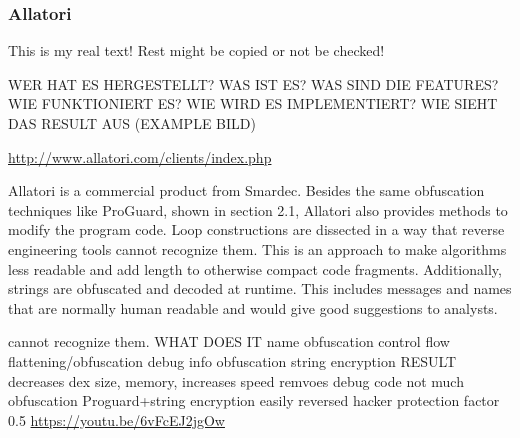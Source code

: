 \subsubsection{Allatori} \label{subsubsection:counter-reengineering-optobf-allatori}
This is my real text! Rest might be copied or not be checked!



WER HAT ES HERGESTELLT? WAS IST ES? WAS SIND DIE FEATURES? WIE FUNKTIONIERT ES? WIE WIRD ES IMPLEMENTIERT? WIE SIEHT DAS RESULT AUS (EXAMPLE BILD)\newline

\url{http://www.allatori.com/clients/index.php}\newline

Allatori is a commercial product from Smardec.\newline
Besides the same obfuscation techniques like ProGuard, shown in section 2.1, Allatori also provides methods to modify the program code. Loop constructions are dissected in a way that reverse engineering tools cannot recognize them. This is an approach to make algorithms less readable and add length to otherwise compact code fragments. Additionally, strings are obfuscated and decoded at runtime. This includes messages and names that are normally human readable and would give good suggestions to analysts.\newline

cannot recognize them.
WHAT DOES IT\newline
name obfuscation\newline
control flow flattening/obfuscation\newline
debug info obfuscation\newline
string encryption\newline
RESULT\newline
decreases dex size, memory, increases speed\newline
remvoes debug code\newline
not much obfuscation\newline
Proguard+string encryption\newline
easily reversed\newline
hacker protection factor 0.5\newline
\url{https://youtu.be/6vFcEJ2jgOw}


